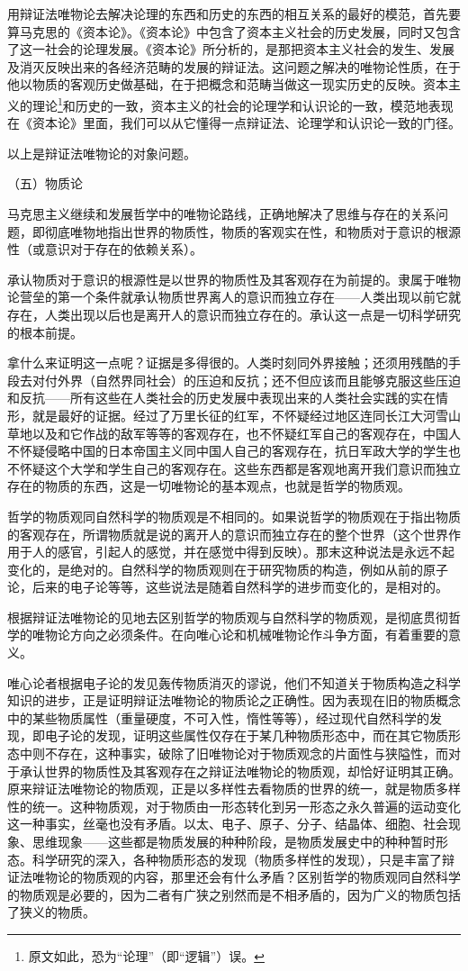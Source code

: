 \documentclass[UTF8, 12pt, a4paper]{ctexrep}
\begin{document}
用辩证法唯物论去解决论理的东西和历史的东西的相互关系的最好的模范，首先要算马克思的《资本论》。《资本论》中包含了资本主义社会的历史发展，同时又包含了这一社会的论理发展。《资本论》所分析的，是那把资本主义社会的发生、发展及消灭反映出来的各经济范畴的发展的辩证法。这问题之解决的唯物论性质，在于他以物质的客观历史做基础，在于把概念和范畴当做这一现实历史的反映。资本主义的理论\footnote{原文如此，恐为“论理”（即“逻辑”）误。}和历史的一致，资本主义的社会的论理学和认识论的一致，模范地表现在《资本论》里面，我们可以从它懂得一点辩证法、论理学和认识论一致的门径。

以上是辩证法唯物论的对象问题。

（五）物质论

马克思主义继续和发展哲学中的唯物论路线，正确地解决了思维与存在的关系问题，即彻底唯物地指出世界的物质性，物质的客观实在性，和物质对于意识的根源性（或意识对于存在的依赖关系）。

承认物质对于意识的根源性是以世界的物质性及其客观存在为前提的。隶属于唯物论营垒的第一个条件就承认物质世界离人的意识而独立存在——人类出现以前它就存在，人类出现以后也是离开人的意识而独立存在的。承认这一点是一切科学研究的根本前提。

拿什么来证明这一点呢？证据是多得很的。人类时刻同外界接触；还须用残酷的手段去对付外界（自然界同社会）的压迫和反抗；还不但应该而且能够克服这些压迫和反抗——所有这些在人类社会的历史发展中表现出来的人类社会实践的实在情形，就是最好的证据。经过了万里长征的红军，不怀疑经过地区连同长江大河雪山草地以及和它作战的敌军等等的客观存在，也不怀疑红军自己的客观存在，中国人不怀疑侵略中国的日本帝国主义同中国人自己的客观存在，抗日军政大学的学生也不怀疑这个大学和学生自己的客观存在。这些东西都是客观地离开我们意识而独立存在的物质的东西，这是一切唯物论的基本观点，也就是哲学的物质观。

哲学的物质观同自然科学的物质观是不相同的。如果说哲学的物质观在于指出物质的客观存在，所谓物质就是说的离开人的意识而独立存在的整个世界（这个世界作用于人的感官，引起人的感觉，并在感觉中得到反映）。那末这种说法是永远不起变化的，是绝对的。自然科学的物质观则在于研究物质的构造，例如从前的原子论，后来的电子论等等，这些说法是随着自然科学的进步而变化的，是相对的。

根据辩证法唯物论的见地去区别哲学的物质观与自然科学的物质观，是彻底贯彻哲学的唯物论方向之必须条件。在向唯心论和机械唯物论作斗争方面，有着重要的意义。

唯心论者根据电子论的发见轰传物质消灭的谬说，他们不知道关于物质构造之科学知识的进步，正是证明辩证法唯物论的物质论之正确性。因为表现在旧的物质概念中的某些物质属性（重量硬度，不可入性，惰性等等），经过现代自然科学的发现，即电子论的发现，证明这些属性仅存在于某几种物质形态中，而在其它物质形态中则不存在，这种事实，破除了旧唯物论对于物质观念的片面性与狭隘性，而对于承认世界的物质性及其客观存在之辩证法唯物论的物质观，却恰好证明其正确。原来辩证法唯物论的物质观，正是以多样性去看物质的世界的统一，就是物质多样性的统一。这种物质观，对于物质由一形态转化到另一形态之永久普遍的运动变化这一种事实，丝毫也没有矛盾。以太、电子、原子、分子、结晶体、细胞、社会现象、思维现象——这些都是物质发展的种种阶段，是物质发展史中的种种暂时形态。科学研究的深入，各种物质形态的发现（物质多样性的发现），只是丰富了辩证法唯物论的物质观的内容，那里还会有什么矛盾？区别哲学的物质观同自然科学的物质观是必要的，因为二者有广狭之别然而是不相矛盾的，因为广义的物质包括了狭义的物质。
\end{document}
